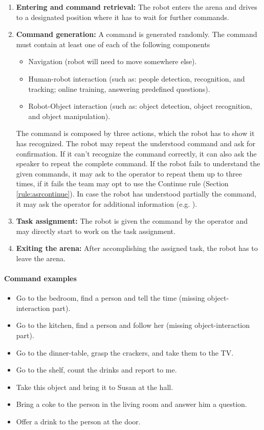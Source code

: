 \begin{enumerate}
\item \textbf{Entering and command retrieval:} The robot enters the arena and drives to a designated position where it has to wait for further commands.
\item \textbf{Command generation:} A command is generated randomly. The command must contain at least one of each of the following components
\begin{itemize}
\item Navigation (robot will need to move somewhere else).
\item Human-robot interaction (such as: people detection, recognition, and tracking; online training, answering predefined questions).
\item Robot-Object interaction (such as: object detection, object recognition, and object manipulation).
\end{itemize}
The command is composed by three actions, which the robot has to show it has recognized. The robot may repeat the understood command and ask for confirmation. If it can't recognize the command correctly, it can also ask the speaker to repeat the complete command. If the robot fails to understand the given commands, it may ask to the operator to repeat them up to three times, if it fails the team may opt to use the Continue rule (Section \ref{rule:asrcontinue}). In case the robot has understood partially the command, it may ask the operator for additional information (e.g. ).
\item \textbf{Task assignment:} The robot is given the command by the operator and may directly start to work on the task assignment.
\item \textbf{Exiting the arena:} After accomplishing the assigned task, the robot has to leave the arena.
\end{enumerate}

\paragraph{Command examples}
\begin{itemize}
\item Go to the bedroom, find a person and tell the time (missing object-interaction part).
\item Go to the kitchen, find a person and follow her (missing object-interaction part).
\item Go to the dinner-table, grasp the crackers, and take them to the TV.
\item Go to the shelf, count the drinks and report to me.
\item Take this object and bring it to Susan at the hall.
\item Bring a coke to the person in the living room and answer him a question.
\item Offer a drink to the person at the door.
\end{itemize}


